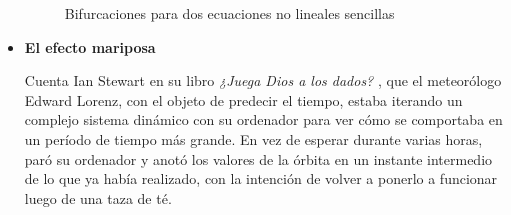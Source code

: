 \documentclass[letterpaper, 11pt, oneside]{article}
\theoremstyle{definition}
\theoremstyle{remark}
\begin{document}
\begin{itemize}
\begin{figure}[h!]
	\centering
	\hspace{0cm}
	\caption{Bifurcaciones para dos ecuaciones no lineales sencillas}
	\label{bifur_dos_ecuaciones}
\end{figure}

\newpage
\item {\bf El efecto mariposa \par} \cite{edumat}
Cuenta Ian Stewart en su libro \textit{¿Juega Dios a los dados?} \cite{Stewart}, que el meteorólogo Edward Lorenz, con el objeto de predecir el tiempo, estaba iterando un complejo sistema dinámico con su ordenador para ver cómo se comportaba en un período de tiempo más grande. En vez de esperar durante varias horas, paró su ordenador y anotó los valores de la órbita en un instante intermedio de lo que ya había realizado, con la intención de volver a ponerlo a funcionar luego de una taza de té.


\end{itemize}
\end{document}
